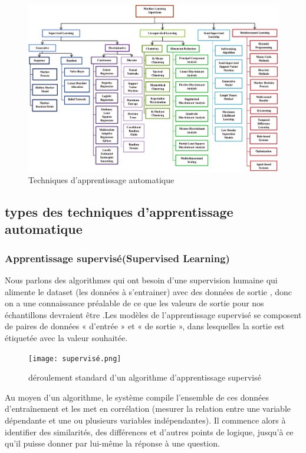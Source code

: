      \begin{figure}[htbp]
     \centering    \includegraphics[width=1\textwidth,height=0.5\textheight]{img/Machine_Learning_ML_methods_taxonomy2.png}
     \caption{Techniques d'apprentissage automatique  \cite{sundararajan2021}}
     \label{fig:example2}
     \end{figure}

\subsection{types des techniques d'apprentissage automatique}   
\subsubsection{Apprentissage supervisé(Supervised Learning)}
Nous parlons des algorithmes qui ont besoin d'une supervision humaine qui alimente le dataset (les données à s'entrainer) avec des données de sortie , donc on a une connaissance préalable de ce que les valeurs de sortie pour nos échantillons devraient être \cite{apprentissage_supervise_definition}.Les modèles de l'apprentissage supervisé se composent de paires de données « d'entrée » et « de sortie », dans lesquelles la sortie est étiquetée avec la valeur souhaitée\cite{what_is_machine_learning}.
     \begin{figure}[htbp]
     \centering    
     \texttt{[image: supervisé.png]}
     \caption{déroulement standard d'un algorithme d'apprentissage supervisé  \cite{apprentissage_supervise_definition}}
     \label{fig:example3}
     \end{figure}

     
Au moyen d'un algorithme, le système compile l'ensemble de ces données d'entraînement et les met en corrélation (mesurer la relation entre une variable dépendante et une ou plusieurs variables indépendantes). Il commence alors à identifier des similarités, des différences et d'autres points de logique, jusqu'à ce qu'il puisse donner par lui-même la réponse à une question.

